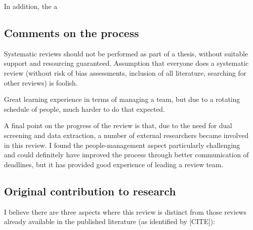 \documentclass[a4paper, twoside]{templates/ociamthesis}
\begin{document}
In addition, the a

\hypertarget{comments-on-the-process}{%
\subsection{Comments on the process}\label{comments-on-the-process}}

Systematic reviews should not be performed as part of a thesis, without suitable support and resourcing guaranteed. Assumption that everyone does a systematic review (without risk of bias assessments, inclusion of all literature, searching for other reviews) is foolish.

Great learning experience in terms of managing a team, but due to a rotating schedule of people, much harder to do that expected.

A final point on the progress of the review is that, due to the need for dual screening and data extraction, a number of external researchers became involved in this review. I found the people-management aspect particularly challenging and could definitely have improved the process through better communication of deadlines, but it has provided good experience of leading a review team.

\hypertarget{original-contribution-to-research}{%
\subsection{Original contribution to research}\label{original-contribution-to-research}}

I believe there are three aspects where this review is distinct from those reviews already available in the published literature (as identified by {[}CITE{]}):
\end{document}
